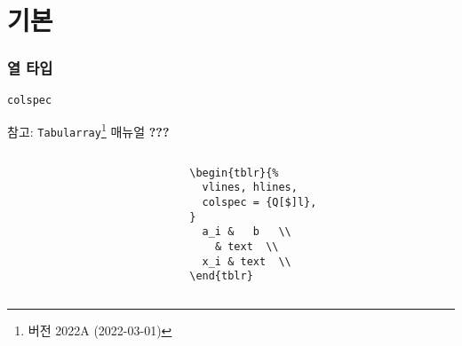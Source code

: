 \documentclass{beamer}
\newcommand*{\manual}[1]{\texttt{Tabularray}\footnote[2]{버전 2022A (2022-03-01)} 매뉴얼 \textbf{#1}}
\begin{document}
\section{기본}
\begin{frame}
  \frametitle{열 타입}
  \texttt{colspec}

  참고: \manual{???}

  \begin{columns}
    \begin{column}{0.5\textwidth}
      \begin{center}
      \end{center}
    \end{column}

    \begin{column}{0.5\textwidth}
      \begin{lstlisting}
    \begin{tblr}{%
      vlines, hlines,
      colspec = {Q[$]l},
    }
      a_i &   b   \\
        & text  \\
      x_i & text  \\
    \end{tblr}
      \end{lstlisting}
    \end{column}
  \end{columns}
\end{frame}
\end{document}
